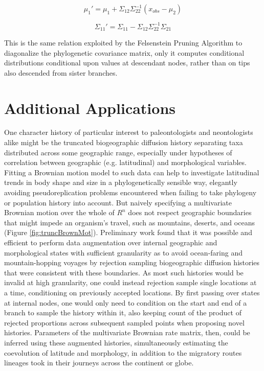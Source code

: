 \documentclass[10pt]{article}
\begin{document}
{\large\[\mu_1' = \mu_1 + \Sigma_{12}\Sigma_{22}^{-1}(x_{obs}-\mu_2)\]}

{\large\[\Sigma_{11}' = \Sigma_{11} - \Sigma_{12}\Sigma_{22}^{-1}\Sigma_{21}\]}

This is the same relation exploited by the Felsenstein Pruning Algorithm to diagonalize the phylogenetic covariance matrix, only it computes conditional distributions conditional upon values at descendant nodes, rather than on tips also descended from sister branches. 

\section{Additional Applications}

One character history of particular interest to paleontologists and neontologists alike might be the truncated biogeographic diffusion history separating taxa distributed across some geographic range, especially under hypotheses of correlation between geographic (e.g. latitudinal) and morphological variables. Fitting a Brownian motion model to such data can help to investigate latitudinal trends in body shape and size in a phylogenetically sensible way, elegantly avoiding pseudoreplication problems encountered when failing to take phylogeny or population history into account. But naively specifying a multivariate Brownian motion over the whole of $R^n$ does not respect geographic boundaries that might impede an organism's travel, such as mountains, deserts, and oceans (Figure \ref{fig:truncBrownMot}). Preliminary work found that it was possible and efficient to perform data augmentation over internal geographic and morphological states with sufficient granularity as to avoid ocean-faring and mountain-hopping voyages by rejection sampling biogeographic diffusion histories that were consistent with these boundaries. As most such histories would be invalid at high granularity, one could instead rejection sample single locations at a time, conditioning on previously accepted locations. By first passing over states at internal nodes, one would only need to condition on the start and end of a branch to sample the history within it, also keeping count of the product of rejected proportions across subsequent sampled points when proposing novel histories. Parameters of the multivariate Brownian rate matrix, then, could be inferred using these augmented histories, simultaneously estimating the coevolution of latitude and morphology, in addition to the migratory routes lineages took in their journeys across the continent or globe. 
\end{document}
